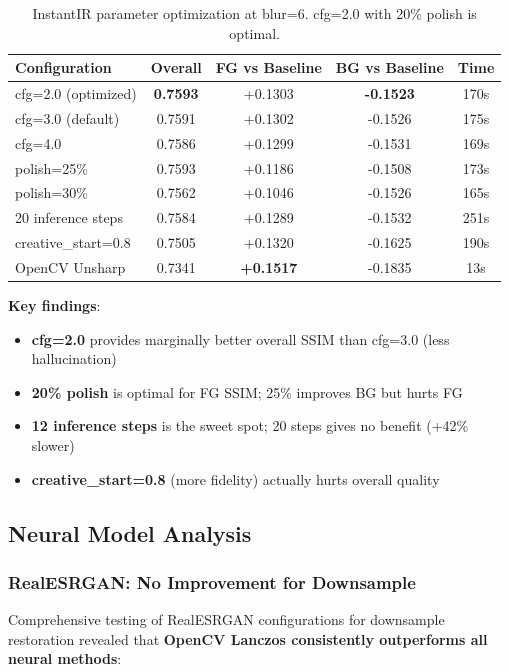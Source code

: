 \documentclass[11pt,a4paper]{article}
\begin{document}
\begin{table}[h]
\centering
\begin{tabular}{lcccc}
\toprule
\textbf{Configuration} & \textbf{Overall} & \textbf{FG vs Baseline} & \textbf{BG vs Baseline} & \textbf{Time} \\
\midrule
cfg=2.0 (optimized) & \textbf{0.7593} & +0.1303 & \textbf{-0.1523} & 170s \\
cfg=3.0 (default) & 0.7591 & +0.1302 & -0.1526 & 175s \\
cfg=4.0 & 0.7586 & +0.1299 & -0.1531 & 169s \\
polish=25\% & 0.7593 & +0.1186 & -0.1508 & 173s \\
polish=30\% & 0.7562 & +0.1046 & -0.1526 & 165s \\
20 inference steps & 0.7584 & +0.1289 & -0.1532 & 251s \\
creative\_start=0.8 & 0.7505 & +0.1320 & -0.1625 & 190s \\
\midrule
OpenCV Unsharp & 0.7341 & \textbf{+0.1517} & -0.1835 & 13s \\
\bottomrule
\end{tabular}
\caption{InstantIR parameter optimization at blur=6. cfg=2.0 with 20\% polish is optimal.}
\label{tab:instantir-config}
\end{table}

\textbf{Key findings}:
\begin{itemize}
    \item \textbf{cfg=2.0} provides marginally better overall SSIM than cfg=3.0 (less hallucination)
    \item \textbf{20\% polish} is optimal for FG SSIM; 25\% improves BG but hurts FG
    \item \textbf{12 inference steps} is the sweet spot; 20 steps gives no benefit (+42\% slower)
    \item \textbf{creative\_start=0.8} (more fidelity) actually hurts overall quality
\end{itemize}

\subsection{Neural Model Analysis}

\subsubsection{RealESRGAN: No Improvement for Downsample}

Comprehensive testing of RealESRGAN configurations for downsample restoration revealed that \textbf{OpenCV Lanczos consistently outperforms all neural methods}:
\end{document}
